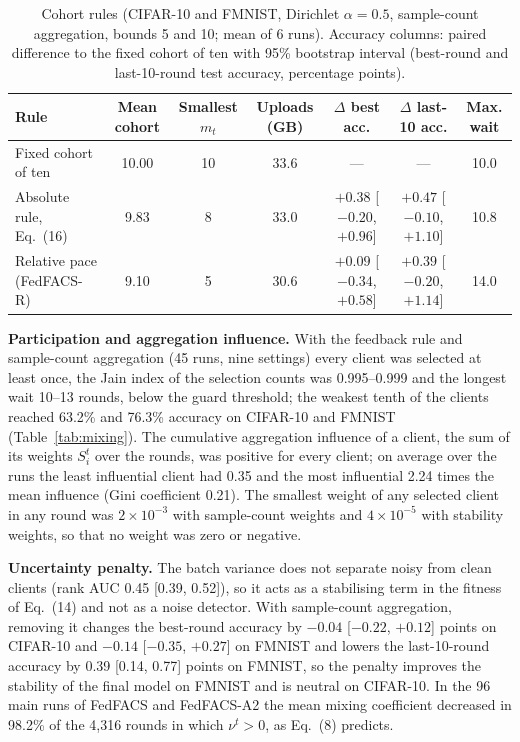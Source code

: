 \documentclass[pdflatex,sn-mathphys-num,oneside]{sn-jnl}%
\theoremstyle{thmstyleone}%
\theoremstyle{thmstyletwo}%
\theoremstyle{thmstylethree}%
\newlength{\journalfloatwidth}
\begin{document}
\begin{table}[!htbp]
\centering
\footnotesize
\setlength{\tabcolsep}{3pt}
\renewcommand{\arraystretch}{1.08}
\caption{Cohort rules (CIFAR-10 and FMNIST, Dirichlet $\alpha=0.5$, sample-count aggregation, bounds 5 and 10; mean of 6 runs). Accuracy columns: paired difference to the fixed cohort of ten with 95\% bootstrap interval (best-round and last-10-round test accuracy, percentage points).}
\label{tab:cohort}
\begin{tabular*}{\journalfloatwidth}{@{\extracolsep{\fill}}lcccccc@{}}
\toprule
Rule & Mean cohort & Smallest $m_t$ & Uploads (GB) & $\Delta$ best acc. & $\Delta$ last-10 acc. & Max. wait \\
\midrule
Fixed cohort of ten & 10.00 & 10 & 33.6 & --- & --- & 10.0 \\
Absolute rule, Eq.~(16) & 9.83 & 8 & 33.0 & $+0.38$ [$-0.20$, $+0.96$] & $+0.47$ [$-0.10$, $+1.10$] & 10.8 \\
Relative pace (FedFACS-R) & 9.10 & 5 & 30.6 & $+0.09$ [$-0.34$, $+0.58$] & $+0.39$ [$-0.20$, $+1.14$] & 14.0 \\
\bottomrule
\end{tabular*}
\end{table}

\textbf{Participation and aggregation influence.} With the feedback rule and sample-count aggregation (45 runs, nine settings) every client was selected at least once, the Jain index of the selection counts was 0.995--0.999 and the longest wait 10--13 rounds, below the guard threshold; the weakest tenth of the clients reached 63.2\% and 76.3\% accuracy on CIFAR-10 and FMNIST (Table~\ref{tab:mixing}). The cumulative aggregation influence of a client, the sum of its weights $S_i^t$ over the rounds, was positive for every client; on average over the runs the least influential client had 0.35 and the most influential 2.24 times the mean influence (Gini coefficient 0.21). The smallest weight of any selected client in any round was $2\times10^{-3}$ with sample-count weights and $4\times10^{-5}$ with stability weights, so that no weight was zero or negative.

\textbf{Uncertainty penalty.} The batch variance does not separate noisy from clean clients (rank AUC 0.45 [0.39, 0.52]), so it acts as a stabilising term in the fitness of Eq.~(14) and not as a noise detector. With sample-count aggregation, removing it changes the best-round accuracy by $-0.04$ [$-0.22$, $+0.12$] points on CIFAR-10 and $-0.14$ [$-0.35$, $+0.27$] on FMNIST and lowers the last-10-round accuracy by 0.39 [0.14, 0.77] points on FMNIST, so the penalty improves the stability of the final model on FMNIST and is neutral on CIFAR-10. In the 96 main runs of FedFACS and FedFACS-A2 the mean mixing coefficient decreased in 98.2\% of the 4,316 rounds in which $\nu^t>0$, as Eq.~(8) predicts.
\end{document}
